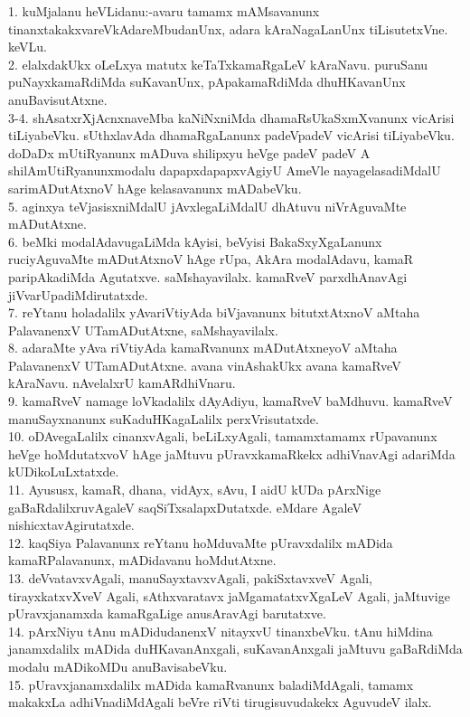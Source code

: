 \documentclass{article}
\begin{document}
1. kuMjalanu heVLidanu:-avaru tamamx mAMsavanunx tinanxtakakxvareVkAdareMbudanUnx, adara kAraNagaLanUnx tiLisutetxVne. keVLu.\\
2. elalxdakUkx oLeLxya matutx keTaTxkamaRgaLeV kAraNavu. puruSanu puNayxkamaRdiMda suKavanUnx, pApakamaRdiMda dhuHKavanUnx anuBavisutAtxne.\\
3-4. shAsatxrXjAcnxnaveMba kaNiNxniMda dhamaRsUkaSxmXvanunx vicArisi tiLiyabeVku. sUthxlavAda dhamaRgaLanunx padeVpadeV vicArisi tiLiyabeVku. doDaDx mUtiRyanunx mADuva shilipxyu heVge padeV padeV A shilAmUtiRyanunxmodalu dapapxdapapxvAgiyU AmeVle nayagelasadiMdalU sarimADutAtxnoV hAge kelasavanunx mADabeVku.\\
5. aginxya teVjasisxniMdalU jAvxlegaLiMdalU dhAtuvu niVrAguvaMte mADutAtxne.\\
6. beMki modalAdavugaLiMda kAyisi, beVyisi BakaSxyXgaLanunx ruciyAguvaMte mADutAtxnoV hAge rUpa, AkAra modalAdavu, kamaR paripAkadiMda Agutatxve. saMshayavilalx. kamaRveV parxdhAnavAgi jiVvarUpadiMdirutatxde.\\
7. reYtanu holadalilx yAvariVtiyAda biVjavanunx bitutxtAtxnoV aMtaha PalavanenxV UTamADutAtxne, saMshayavilalx.\\
8. adaraMte yAva riVtiyAda kamaRvanunx mADutAtxneyoV aMtaha PalavanenxV UTamADutAtxne. avana vinAshakUkx avana kamaRveV kAraNavu. nAvelalxrU kamARdhiVnaru.\\
9. kamaRveV namage loVkadalilx dAyAdiyu, kamaRveV baMdhuvu. kamaRveV manuSayxnanunx suKaduHKagaLalilx perxVrisutatxde.\\
10. oDAvegaLalilx cinanxvAgali, beLiLxyAgali, tamamxtamamx rUpavanunx heVge hoMdutatxvoV hAge jaMtuvu pUravxkamaRkekx adhiVnavAgi adariMda kUDikoLuLxtatxde.\\
11. Ayususx, kamaR, dhana, vidAyx, sAvu, I aidU kUDa pArxNige gaBaRdalilxruvAgaleV saqSiTxsalapxDutatxde. eMdare AgaleV nishicxtavAgirutatxde.\\
12. kaqSiya Palavanunx reYtanu hoMduvaMte pUravxdalilx mADida kamaRPalavanunx, mADidavanu hoMdutAtxne.\\
13. deVvatavxvAgali, manuSayxtavxvAgali, pakiSxtavxveV Agali, tirayxkatxvXveV Agali, sAthxvaratavx jaMgamatatxvXgaLeV Agali, jaMtuvige pUravxjanamxda kamaRgaLige anusAravAgi barutatxve.\\
14. pArxNiyu tAnu mADidudanenxV nitayxvU tinanxbeVku. tAnu hiMdina janamxdalilx mADida duHKavanAnxgali, suKavanAnxgali jaMtuvu gaBaRdiMda modalu mADikoMDu anuBavisabeVku.\\
15. pUravxjanamxdalilx mADida kamaRvanunx baladiMdAgali, tamamx makakxLa adhiVnadiMdAgali beVre riVti tirugisuvudakekx AguvudeV ilalx.\\
\end{document}
